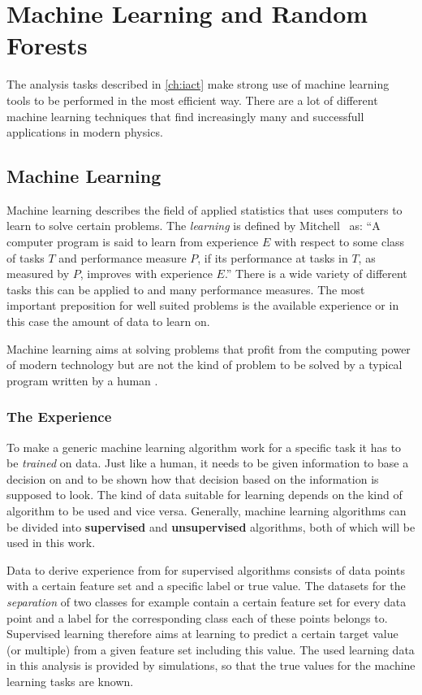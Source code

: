 \chapter{Machine Learning and Random Forests}
\label{ch:ML}
%
The analysis tasks described in \autoref{ch:iact} make strong use of machine
learning tools to be performed in the most efficient way. There are a lot of
different machine learning techniques that find increasingly many and
successfull applications in modern physics.

\section{Machine Learning}
%
Machine learning describes the field of applied statistics that uses computers to learn to solve certain problems. The \textit{learning} is defined by Mitchell~\cite{mitchell} as: \enquote{A computer program is said to learn from experience $E$ with respect to some class of tasks $T$ and performance measure $P$, if its performance at tasks in $T$, as measured by $P$, improves with experience $E$.} There is a wide variety of different tasks this can be applied to and many performance measures. The most important preposition for well suited problems is the available experience or in this case the amount of data to learn on.

Machine learning aims at solving problems that profit from the computing power
of modern technology but are not the kind of problem to be solved by a typical
program written by a human \cite{goodfellow}.

\subsection{The Experience}
%
To make a generic machine learning algorithm work for a specific task it has to
be \textit{trained} on data. Just like a human, it needs to be given
information to base a decision on and to be shown how that decision based on
the information is supposed to look. The kind of data suitable for learning
depends on the kind of algorithm to be used and vice versa. Generally, machine
learning algorithms can be divided into \textbf{supervised} and
\textbf{unsupervised} algorithms, both of which will be used in this work.

Data to derive experience from for supervised algorithms consists of data points
with a certain feature set and a specific label or true value. The datasets for
the \textit{separation} of two classes for example contain a certain feature
set for every data point and a label for the corresponding class each of these
points belongs to. Supervised learning therefore aims at learning to predict
a certain target value (or multiple) from a given feature set including this
value. The used learning data in this analysis is provided by simulations, so
that the true values for the machine learning tasks are known.

